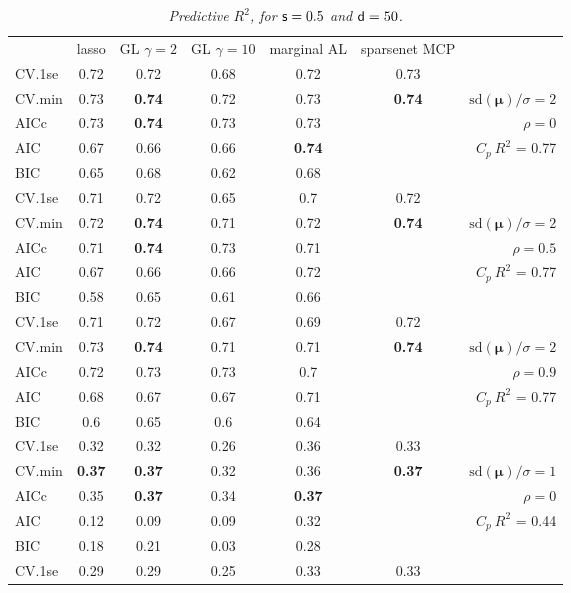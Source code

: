 \documentclass[12pt]{article}
\newcommand{\mr}[1]{\mathrm{#1}}
\newcommand{\bm}[1]{\mathbf{#1}}
\begin{document}
\begin{table}[p]\vspace{-.5cm}
\caption[l]{\label{r2}\it Predictive $R^2$, for ${\sf s}=0.5$ and  ${\sf d}=50$.}
\vspace{-.5cm}
\small{}
\begin{center}
\begin{tabular}{l*{5}{c}|r}
 & lasso & GL $\gamma=2$ & GL $\gamma=10$ & marginal AL & sparsenet MCP  &  \\
\cline{1-7}
CV.1se & 0.72 & 0.72 & 0.68 & 0.72 & 0.73 &\\
CV.min & 0.73 & {\bf 0.74} & 0.72 & 0.73 & {\bf 0.74} &  $\mr{sd}(\bm{\mu})/\sigma=2$ \\
AICc & 0.73 & {\bf 0.74} & 0.73 & 0.73 & & $\rho=0$ \\
AIC & 0.67 & 0.66 & 0.66 & {\bf 0.74} & & \multirow{2}{*}{$C_p ~ R^2$ = 0.77} \\
BIC & 0.65 & 0.68 & 0.62 & 0.68 & & \\
 \hline 
CV.1se & 0.71 & 0.72 & 0.65 & 0.7 & 0.72 &\\
CV.min & 0.72 & {\bf 0.74} & 0.71 & 0.72 & {\bf 0.74} &  $\mr{sd}(\bm{\mu})/\sigma=2$ \\
AICc & 0.71 & {\bf 0.74} & 0.73 & 0.71 & & $\rho=0.5$ \\
AIC & 0.67 & 0.66 & 0.66 & 0.72 & & \multirow{2}{*}{$C_p ~ R^2$ = 0.77} \\
BIC & 0.58 & 0.65 & 0.61 & 0.66 & & \\
 \hline 
CV.1se & 0.71 & 0.72 & 0.67 & 0.69 & 0.72 &\\
CV.min & 0.73 & {\bf 0.74} & 0.71 & 0.71 & {\bf 0.74} &  $\mr{sd}(\bm{\mu})/\sigma=2$ \\
AICc & 0.72 & 0.73 & 0.73 & 0.7 & & $\rho=0.9$ \\
AIC & 0.68 & 0.67 & 0.67 & 0.71 & & \multirow{2}{*}{$C_p ~ R^2$ = 0.77} \\
BIC & 0.6 & 0.65 & 0.6 & 0.64 & & \\
 \hline 
CV.1se & 0.32 & 0.32 & 0.26 & 0.36 & 0.33 &\\
CV.min & {\bf 0.37} & {\bf 0.37} & 0.32 & 0.36 & {\bf 0.37} &  $\mr{sd}(\bm{\mu})/\sigma=1$ \\
AICc & 0.35 & {\bf 0.37} & 0.34 & {\bf 0.37} & & $\rho=0$ \\
AIC & 0.12 & 0.09 & 0.09 & 0.32 & & \multirow{2}{*}{$C_p ~ R^2$ = 0.44} \\
BIC & 0.18 & 0.21 & 0.03 & 0.28 & & \\
 \hline 
CV.1se & 0.29 & 0.29 & 0.25 & 0.33 & 0.33 &\\

\end{tabular}
\end{center}
\end{table}
\end{document}
